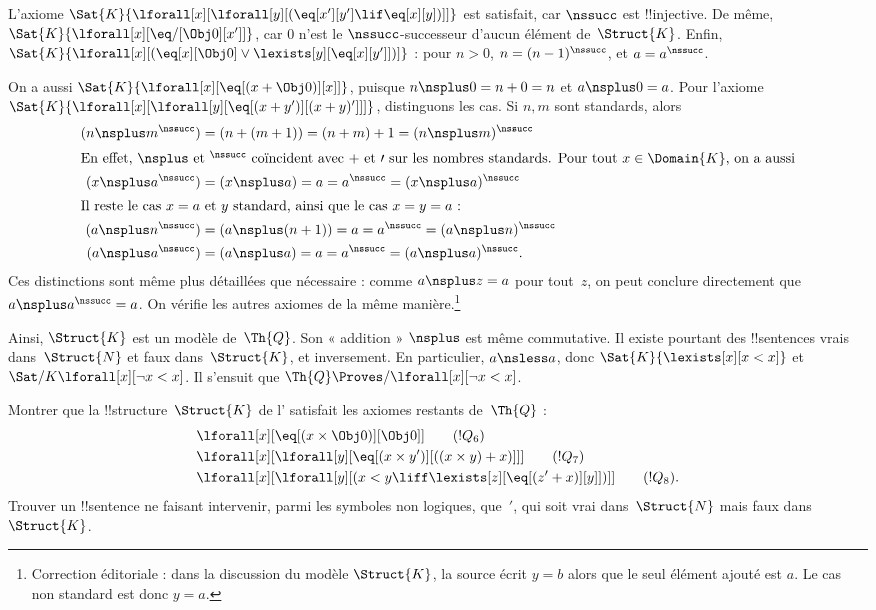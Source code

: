 \documentclass[../../../include/open-logic-section]{subfiles}
\begin{document}
\begin{ex}
L'axiome
$\Sat{K}{\lforall[x][\lforall[y][
(\eq[x'][y']\lif\eq[x][y])]]}$
est satisfait, car $\nssucc$ est !!{injective}.
De même,
$\Sat{K}{\lforall[x][\eq/[\Obj 0][x']]}$,
car $0$ n'est le $\nssucc$-successeur d'aucun
élément de~$\Struct{K}$. Enfin,
$\Sat{K}{\lforall[x][(\eq[x][\Obj 0]\lor
\lexists[y][\eq[x][y']])]}$ :
pour $n>0$, $n=(n-1)^\nssucc$,
et $a=a^\nssucc$.

On a aussi
$\Sat{K}{\lforall[x][\eq[(x+\Obj 0)][x]]}$,
puisque $n\nsplus 0=n+0=n$ et
$a\nsplus 0=a$. Pour l'axiome
$\Sat{K}{\lforall[x][\lforall[y][
\eq[(x+y')][(x+y)']]]}$, distinguons les cas.
Si $n,m$ sont standards, alors
\begin{align*}
(n\nsplus m^\nssucc)
  &=(n+(m+1))=(n+m)+1
   =(n\nsplus m)^\nssucc\\
\intertext{En effet, $\nsplus$ et $^\nssucc$
  coïncident avec $+$ et $\prime$ sur les
  nombres standards. Pour tout
  $x\in\Domain{K}$, on a aussi}
(x\nsplus a^\nssucc)
  &=(x\nsplus a)=a=a^\nssucc
   =(x\nsplus a)^\nssucc\\
\intertext{Il reste le cas $x=a$ et $y$ standard,
  ainsi que le cas $x=y=a$ :}
(a\nsplus n^\nssucc)
  &=(a\nsplus(n+1))=a=a^\nssucc
   =(a\nsplus n)^\nssucc\\
(a\nsplus a^\nssucc)
  &=(a\nsplus a)=a=a^\nssucc
   =(a\nsplus a)^\nssucc.
\end{align*}
Ces distinctions sont même plus détaillées
que nécessaire : comme $a\nsplus z=a$
pour tout~$z$, on peut conclure directement
que $a\nsplus a^\nssucc=a$. On vérifie
les autres axiomes de la même manière.\footnote{Correction éditoriale : dans la discussion du modèle $\Struct{K}$, la source écrit $y=b$ alors que le seul élément ajouté est $a$. Le cas non standard est donc $y=a$.}

Ainsi, $\Struct{K}$ est un modèle de~$\Th{Q}$.
Son « addition » $\nsplus$ est même commutative.
Il existe pourtant des !!{sentence}s vrais
dans~$\Struct{N}$ et faux dans~$\Struct{K}$,
et inversement. En particulier,
$a\nsless a$, donc
$\Sat{K}{\lexists[x][x<x]}$ et
$\Sat/{K}{\lforall[x][\lnot x<x]}$.
Il s'ensuit que
$\Th{Q}\Proves/\lforall[x][\lnot x<x]$.
\end{ex}

\begin{prob}
Montrer que la !!{structure}~$\Struct{K}$ de
l'
satisfait les axiomes restants de~$\Th{Q}$ :
\begin{align*}
  & \lforall[x][\eq[(x\times\Obj 0)][\Obj 0]]
    \tag{$!Q_6$}\\
  & \lforall[x][\lforall[y][
    \eq[(x\times y')][((x\times y)+x)]]]
    \tag{$!Q_7$}\\
  & \lforall[x][\lforall[y][
    (x<y\liff\lexists[z][\eq[(z'+x)][y]])]]
    \tag{$!Q_8$}.
\end{align*}
Trouver un !!{sentence} ne faisant intervenir,
parmi les symboles non logiques, que~$\prime$,
qui soit vrai dans~$\Struct{N}$ mais faux
dans~$\Struct{K}$.
\end{prob}
\end{document}
